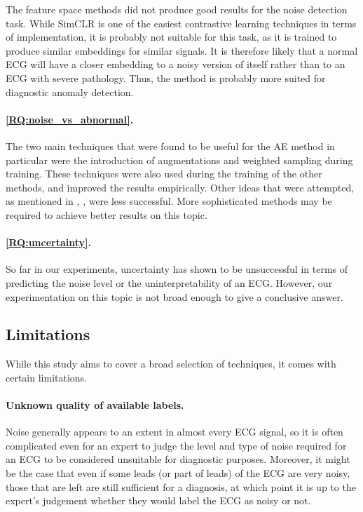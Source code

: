 \documentclass[a4paper,10pt]{article}
\newcommand{\refsec}[1]{\Cref{#1}, \emph{\nameref{#1}}}
\begin{document}
The feature space methods did not produce good results for the noise detection task. While SimCLR is one of the easiest contrastive learning techniques in terms of implementation, it is probably not suitable for this task, as it is trained to produce similar embeddings for similar signals. It is therefore likely that a normal ECG will have a closer embedding to a noisy version of itself rather than to an ECG with severe pathology. Thus, the method is probably more suited for diagnostic anomaly detection.

\paragraph{\ref{RQ:noise_vs_abnormal}.} The two main techniques that were found to be useful for the AE method in particular were the introduction of augmentations and weighted sampling during training. These techniques were also used during the training of the other methods, and improved the results empirically. Other ideas that were attempted, as mentioned in \refsec{sec:ae_exp}, were less successful. More sophisticated methods may be required to achieve better results on this topic.

\paragraph{\ref{RQ:uncertainty}.} So far in our experiments, uncertainty has shown to be unsuccessful in terms of predicting the noise level or the uninterpretability of an ECG. However, our experimentation on this topic is not broad enough to give a conclusive answer.  


\subsection{Limitations}
\label{sec:limitations}

While this study aims to cover a broad selection of techniques, it comes with certain limitations.

\paragraph{Unknown quality of available labels.} Noise generally appears to an extent in almost every ECG signal, so it is often complicated even for an expert to judge the level and type of noise required for an ECG to be considered unsuitable for diagnostic purposes. Moreover, it might be the case that even if some leads (or part of leads) of the ECG are very noisy, those that are left are still sufficient for a diagnosis, at which point it is up to the expert's judgement whether they would label the ECG as noisy or not.
\end{document}
